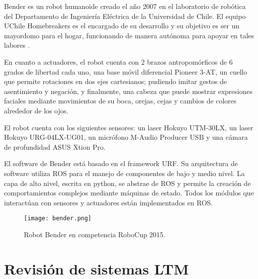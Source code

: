 Bender es un robot humanoide creado el año 2007 en el laboratorio de robótica del Departamento de Ingeniería Eléctrica de la Universidad de Chile. El equipo UChile Homebreakers es el encargado de su desarrollo y  su objetivo es ser un mayordomo para el hogar, funcionando de manera autónoma para apoyar en tales labores \cite{uchile-robotics}.



En cuanto a actuadores, el robot cuenta con 2 brazos antropomórficos de 6 grados de libertad cada uno, una base móvil diferencial Pioneer 3-AT, un cuello que permite rotaciones en dos ejes cartesianos; pudiendo imitar gestos de asentimiento y negación, y finalmente, una cabeza que puede mostrar expresiones faciales mediante movimientos de su boca, orejas, cejas y cambios de colores alrededor de los ojos.

El robot cuenta con los siguientes sensores: un laser Hokuyo UTM-30LX, un laser Hokuyo URG-04LX-UG01, un micrófono M-Audio Producer USB y una cámara de profundidad ASUS Xtion Pro.

El software de Bender está basado en el framework URF. Su arquitectura de software utiliza  ROS para el manejo de componentes de bajo y medio nivel. La capa de alto nivel, escrita en python, se abstrae de ROS y permite la creación de comportamientos complejos mediante máquinas de estado. Todos los módulos que interactúan con sensores y actuadores están implementados en ROS.

\begin{figure}[h!]
	\centering
	\texttt{[image: bender.png]}
	\caption{\small Robot Bender en competencia RoboCup 2015.}
	\label{img:bender}
\end{figure}



%




\section{Revisión de sistemas LTM}

